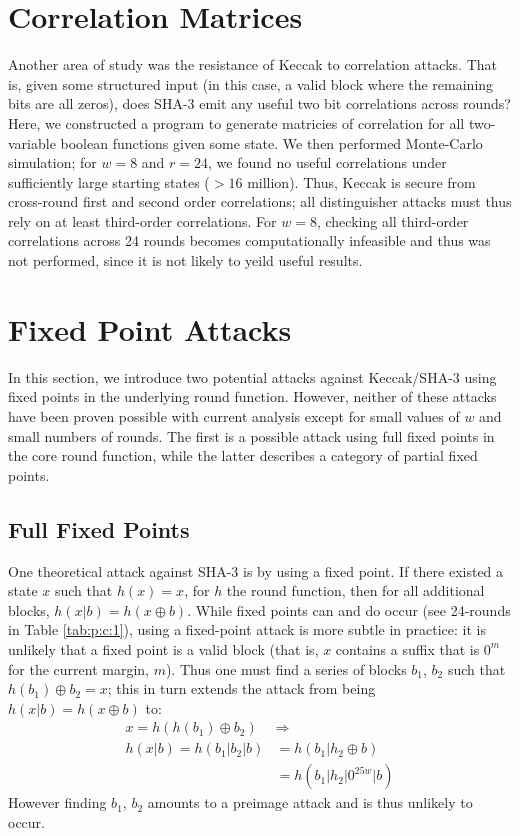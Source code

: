 \documentclass[10pt,twocolumn,twoside]{pnas-new}
\begin{document}
\section{Correlation Matrices} \label{sec:correlation}

Another area of study was the resistance of Keccak to correlation attacks.
That is, given some structured input (in this case, a valid block where the
remaining bits are all zeros), does SHA-3 emit any useful two bit correlations
across rounds? Here, we constructed a program to generate matricies of
correlation for all two-variable boolean functions given some state. We then
performed Monte-Carlo simulation; for $w=8$ and $r=24$, we found no useful
correlations under sufficiently large starting states ($>16$ million). Thus,
Keccak is secure from cross-round first and second order correlations; all
distinguisher attacks must thus rely on at least third-order correlations. For
$w=8$, checking all third-order correlations across 24 rounds becomes
computationally infeasible and thus was not performed, since it is not likely
to yeild useful results.

\section{Fixed Point Attacks} \label{sec:fixed}

In this section, we introduce two potential attacks against Keccak/SHA-3 using
fixed points in the underlying round function. However, neither of these
attacks have been proven possible with current analysis except for small values
of $w$ and small numbers of rounds. The first is a possible attack using full
fixed points in the core round function, while the latter describes a category
of partial fixed points.


\subsection{Full Fixed Points} \label{sec:f:full}


One theoretical attack against SHA-3 is by using a fixed point. If there
existed a state $x$ such that $h(x) = x$, for $h$ the round function, then
for all additional blocks, $h(x | b) = h(x \oplus b)$. While fixed points can
and do occur (see 24-rounds in Table \ref{tab:p:c:1}), using a fixed-point
attack is more subtle in practice: it is unlikely that a fixed point is a valid
block (that is, $x$ contains a suffix that is $0^{m}$ for the current margin,
$m$). Thus one must find a series of blocks $b_1$, $b_2$ such that
$h(b_1) \oplus b_2 = x$; this in turn extends the attack from being
$h(x | b) = h(x \oplus b)$ to:
\begin{align*}
    x = h(h(b_1) \oplus b_2) & \Rightarrow \\
    h(x | b) = h(b_1 | b_2 | b) & = h(b_1 | h_2 \oplus b) \\
    & = h(b_1 | h_2 | 0^{25w} | b)
\end{align*}
However finding $b_1$, $b_2$ amounts to a preimage attack and is thus unlikely
to occur.
\end{document}
